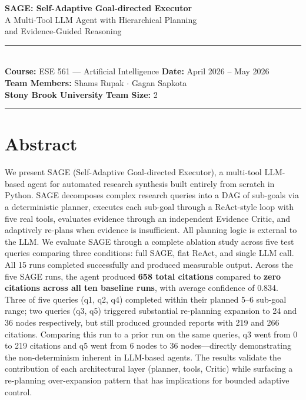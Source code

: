 \documentclass[11pt]{article}
\begin{document}

\begin{center}
  {\LARGE\bfseries\color{primary} SAGE: Self-Adaptive Goal-directed Executor}\\[4pt]
  {\large A Multi-Tool LLM Agent with Hierarchical Planning\\
  and Evidence-Guided Reasoning}\\[10pt]
  \rule{\linewidth}{1pt}\\[6pt]
  {\normalsize
  \textbf{Course:} ESE 561 --- Artificial Intelligence \hspace{1.5cm}
  \textbf{Date:} April 2026 -- May 2026 \\[4pt]
  \textbf{Team Members:} Shams Rupak \quad $\cdot$ \quad Gagan Sapkota \\[4pt]
  \textbf{Stony Brook University} \hspace{1.8cm} \textbf{Team Size:} 2
  }\\[4pt]
  \rule{\linewidth}{0.4pt}
\end{center}

\vspace{0.4em}

\section{Abstract}

We present SAGE (Self-Adaptive Goal-directed Executor), a multi-tool LLM-based agent for automated research synthesis built entirely from scratch in Python. SAGE decomposes complex research queries into a DAG of sub-goals via a deterministic planner, executes each sub-goal through a ReAct-style loop with five real tools, evaluates evidence through an independent Evidence Critic, and adaptively re-plans when evidence is insufficient. All planning logic is external to the LLM. We evaluate SAGE through a complete ablation study across five test queries comparing three conditions: full SAGE, flat ReAct, and single LLM call. All 15 runs completed successfully and produced measurable output. Across the five SAGE runs, the agent produced \textbf{658 total citations} compared to \textbf{zero citations across all ten baseline runs}, with average confidence of 0.834. Three of five queries (q1, q2, q4) completed within their planned 5--6 sub-goal range; two queries (q3, q5) triggered substantial re-planning expansion to 24 and 36 nodes respectively, but still produced grounded reports with 219 and 266 citations. Comparing this run to a prior run on the same queries, q3 went from 0 to 219 citations and q5 went from 6 nodes to 36 nodes---directly demonstrating the non-determinism inherent in LLM-based agents. The results validate the contribution of each architectural layer (planner, tools, Critic) while surfacing a re-planning over-expansion pattern that has implications for bounded adaptive control.
\end{document}
